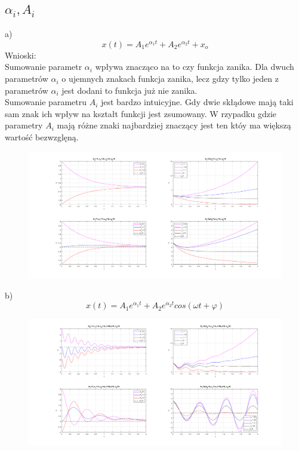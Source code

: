 \documentclass{article}
\begin{document}
\subsection{$\alpha_i,A_i$}
a)
$$
x(t)=A_1e^{\alpha_1 t}+A_2e^{\alpha_2 t} + x_o
$$
Wnioski:\\
Sumowanie parametr $\alpha_i$ wpływa znacząco na to czy funkcja zanika. Dla dwuch parametrów $\alpha_i$ o ujemnych znakach funkcja zanika, lecz gdzy tylko jeden z parametrów $\alpha_i$ jest dodani to funkcja już nie zanika. \\
Sumowanie parametru $A_i$ jest bardzo intuicyjne. Gdy dwie skłądowe mają taki sam znak ich wpływ na kształt funkcji jest zsumowany. W rzypadku gdzie parametry $A_i$ mają różne znaki najbardziej znaczący jest ten któy ma większą wartość bezwzglęną.  \\
\newpage
\begin{figure}[h]
    \centering
    \includegraphics[width=1\textwidth]{c_graphs.png}
    \label{fig:my_label}
\end{figure}
b)
$$
x(t)=A_1e^{\alpha_1 t}+A_2e^{\alpha_2 t}cos(\omega t+\varphi)
$$
\begin{figure}[h!]
    \centering
    \includegraphics[width=1\textwidth]{d_graphs.png}
    \label{fig:my_label}
\end{figure}
\end{document}
